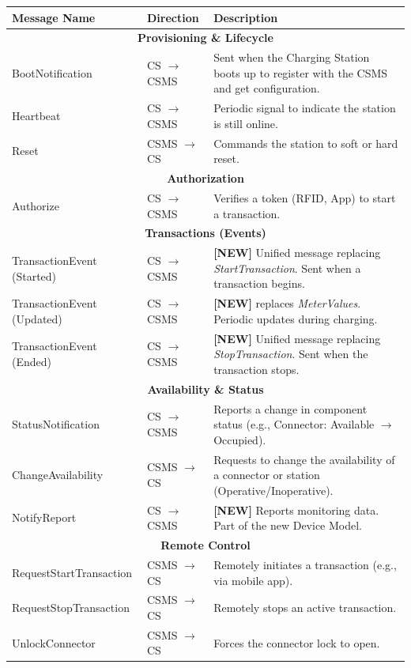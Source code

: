 \documentclass[a4paper,11pt]{report}
\begin{document}
\begin{center}
\renewcommand{\arraystretch}{1.3}
\begin{tabular}{|p{}|p{}|p{}|}
\hline
\textbf{Message Name} & \textbf{Direction} & \textbf{Description} \\ \hline

\multicolumn{3}{|c|}{\textbf{Provisioning \& Lifecycle}} \\ \hline
BootNotification & CS $\to$ CSMS & Sent when the Charging Station boots up to register with the CSMS and get configuration. \\ \hline
Heartbeat & CS $\to$ CSMS & Periodic signal to indicate the station is still online. \\ \hline
Reset & CSMS $\to$ CS & Commands the station to soft or hard reset. \\ \hline

\multicolumn{3}{|c|}{\textbf{Authorization}} \\ \hline
Authorize & CS $\to$ CSMS & Verifies a token (RFID, App) to start a transaction. \\ \hline

\multicolumn{3}{|c|}{\textbf{Transactions (Events)}} \\ \hline
TransactionEvent (Started) & CS $\to$ CSMS & \textbf{[NEW]} Unified message replacing \textit{StartTransaction}. Sent when a transaction begins. \\ \hline
TransactionEvent (Updated) & CS $\to$ CSMS & \textbf{[NEW]} replaces \textit{MeterValues}. Periodic updates during charging. \\ \hline
TransactionEvent (Ended) & CS $\to$ CSMS & \textbf{[NEW]} Unified message replacing \textit{StopTransaction}. Sent when the transaction stops. \\ \hline

\multicolumn{3}{|c|}{\textbf{Availability \& Status}} \\ \hline
StatusNotification & CS $\to$ CSMS & Reports a change in component status (e.g., Connector: Available $\to$ Occupied). \\ \hline
ChangeAvailability & CSMS $\to$ CS & Requests to change the availability of a connector or station (Operative/Inoperative). \\ \hline
NotifyReport & CS $\to$ CSMS & \textbf{[NEW]} Reports monitoring data. Part of the new Device Model. \\ \hline

\multicolumn{3}{|c|}{\textbf{Remote Control}} \\ \hline
RequestStartTransaction & CSMS $\to$ CS & Remotely initiates a transaction (e.g., via mobile app). \\ \hline
RequestStopTransaction & CSMS $\to$ CS & Remotely stops an active transaction. \\ \hline
UnlockConnector & CSMS $\to$ CS & Forces the connector lock to open. \\ \hline


\end{tabular}
\end{center}
\end{document}
